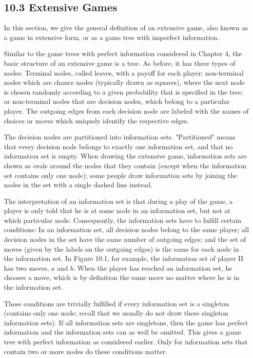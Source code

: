 \documentclass[12pt]{article}
\begin{document}
\subsection*{10.3 Extensive Games}
In this section, we give the general definition of an extensive game, also known as a game in extensive form, or as a game tree with imperfect information.

Similar to the game trees with perfect information considered in Chapter 4, the basic structure of an extensive game is a tree. As before, it has three types of nodes: Terminal nodes, called leaves, with a payoff for each player; non-terminal nodes which are chance nodes (typically drawn as squares), where the next node is chosen randomly according to a given probability that is specified in the tree; or non-terminal nodes that are decision nodes, which belong to a particular player. The outgoing edges from each decision node are labeled with the names of choices or moves which uniquely identify the respective edges.

The decision nodes are partitioned into information sets. "Partitioned" means that every decision node belongs to exactly one information set, and that no information set is empty. When drawing the extensive game, information sets are\\
shown as ovals around the nodes that they contain (except when the information set contains only one node); some people draw information sets by joining the nodes in the set with a single dashed line instead.

The interpretation of an information set is that during a play of the game, a player is only told that he is at some node in an information set, but not at which particular node. Consequently, the information sets have to fulfill certain conditions: In an information set, all decision nodes belong to the same player; all decision nodes in the set have the same number of outgoing edges; and the set of moves (given by the labels on the outgoing edges) is the same for each node in the information set. In Figure 10.1, for example, the information set of player II has two moves, $a$ and $b$. When the player has reached an information set, he chooses a move, which is by definition the same move no matter where he is in the information set.

These conditions are trivially fulfilled if every information set is a singleton (contains only one node; recall that we usually do not draw these singleton information sets). If all information sets are singletons, then the game has perfect information and the information sets can as well be omitted. This gives a game tree with perfect information as considered earlier. Only for information sets that contain two or more nodes do these conditions matter.
\end{document}
